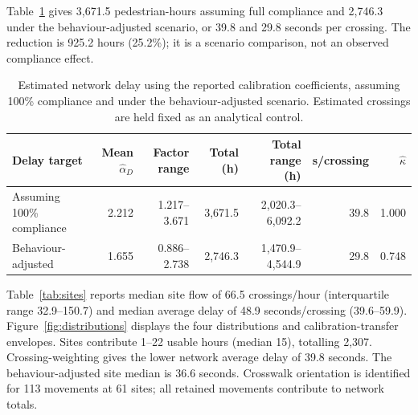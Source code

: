 \documentclass[11pt]{article}
\begin{document}
Table~\ref{tab:delay} gives 3,671.5 pedestrian-hours assuming full compliance and 2,746.3 under the behaviour-adjusted scenario, or 39.8 and 29.8 seconds per crossing. The reduction is 925.2 hours (25.2\%); it is a scenario comparison, not an observed compliance effect.

\begin{table}[htbp]
\centering
\caption{Estimated network delay using the reported calibration coefficients, assuming 100\% compliance and under the behaviour-adjusted scenario. Estimated crossings are held fixed as an analytical control.}
\label{tab:delay}
\footnotesize
\setlength{\tabcolsep}{2.5pt}
\begin{tabular}{@{}>{\raggedright\arraybackslash}p{}rrrrrr@{}}
\toprule
Delay target & Mean $\widehat\alpha_D$ & Factor range & Total (h) & Total range (h) & s/crossing & $\widehat\kappa$ \\
\midrule
Assuming 100\% compliance & 2.212 & 1.217--3.671 & 3{,}671.5 & 2{,}020.3--6{,}092.2 & 39.8 & 1.000 \\
Behaviour-adjusted & 1.655 & 0.886--2.738 & 2{,}746.3 & 1{,}470.9--4{,}544.9 & 29.8 & 0.748 \\
\bottomrule
\end{tabular}
\end{table}

\begin{samepage}
Table~\ref{tab:sites} reports median site flow of 66.5 crossings/hour (interquartile range 32.9--150.7) and median average delay of 48.9 seconds/crossing (39.6--59.9). Figure~\ref{fig:distributions} displays the four distributions and calibration-transfer envelopes. Sites contribute 1--22 usable hours (median 15), totalling 2,307. Crossing-weighting gives the lower network average delay of 39.8 seconds. The behaviour-adjusted site median is 36.6 seconds. Crosswalk orientation is identified for 113 movements at 61 sites; all retained movements contribute to network totals.
\par\end{samepage}
\end{document}
